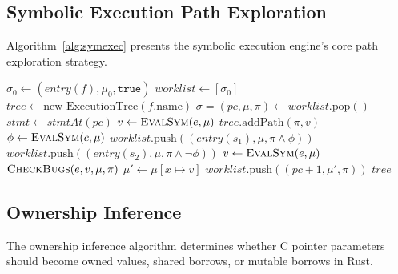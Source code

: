 \documentclass[11pt,a4paper]{article}
\begin{document}
\begin{appendices}
\subsection{Symbolic Execution Path Exploration}\label{app:symexec}

Algorithm~\ref{alg:symexec} presents the symbolic execution engine's
core path exploration strategy.

\begin{algorithm}[h]
\caption{Symbolic Execution}\label{alg:symexec}
\begin{algorithmic}[1]
  \State $\sigma_0 \gets (\mathit{entry}(f), \mu_0, \texttt{true})$
  \State $\mathit{worklist} \gets [\sigma_0]$
  \State $\mathit{tree} \gets \text{new ExecutionTree}(f.\text{name})$
    \State $\sigma = (pc, \mu, \pi) \gets \mathit{worklist}.\text{pop}()$
    \State $\mathit{stmt} \gets \mathit{stmtAt}(pc)$
      \State $v \gets \Call{EvalSym}{e, \mu}$
      \State $\mathit{tree}.\text{addPath}(\pi, v)$
      \State $\phi \gets \Call{EvalSym}{c, \mu}$
        \State $\mathit{worklist}.\text{push}((\mathit{entry}(s_1), \mu, \pi \wedge \phi))$
      \EndIf
        \State $\mathit{worklist}.\text{push}((\mathit{entry}(s_2), \mu, \pi \wedge \neg\phi))$
      \EndIf
      \State $v \gets \Call{EvalSym}{e, \mu}$
      \State $\Call{CheckBugs}{e, v, \mu, \pi}$
      \State $\mu' \gets \mu[x \mapsto v]$
      \State $\mathit{worklist}.\text{push}((pc + 1, \mu', \pi))$
    \EndIf
  \EndWhile
  \State \Return $\mathit{tree}$
\EndProcedure
\end{algorithmic}
\end{algorithm}

\subsection{Ownership Inference}\label{app:ownership}

The ownership inference algorithm determines whether C pointer
parameters should become owned values, shared borrows, or mutable
borrows in Rust.


\end{appendices}
\end{document}
